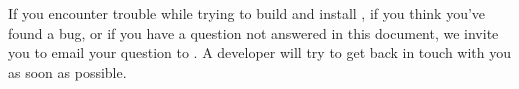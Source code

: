 
If you encounter trouble while trying to build and install \libflamens, if
you think you've found a bug, or if you have a question not answered in
this document, we invite you to email your question to \flameemailns.
A \libflame developer will try to get back in touch with you as soon as
possible.

